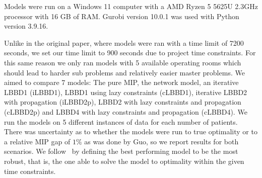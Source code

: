 Models were run on a Windows 11 computer with a AMD Ryzen 5 5625U 2.3GHz processor with 16 GB of RAM\@. Gurobi version 10.0.1 was used with Python version 3.9.16. 

Unlike in the original paper, where models were ran with a time limit of 7200 seconds, we set our time limit to 900 seconds due to project time constraints. For this same reason we only ran models with 5 available operating rooms which should lead to harder sub problems and relatively easier master problems\cite{roshanaei2017propagating}. We aimed to compare 7 models: The pure MIP, the network model, an iterative LBBD1 (iLBBD1), LBBD1 using lazy constraints (cLBBD1), iterative LBBD2 with propagation (iLBBD2p), LBBD2 with lazy constraints and propagation (cLBBD2p) and LBBD4 with lazy constraints and propagation (cLBBD4). We run the models on 5 different instances of data for each number of patients. There was uncertainty as to whether the models were run to true optimality or to a relative MIP gap of $1\%$ as was done by Guo\cite{guo}, so we report results for both scenarios. We follow~\cite{roshanaei2017propagating} by defining the best performing model to be the most robust, that is, the one able to solve the model to optimality within the given time constraints.



